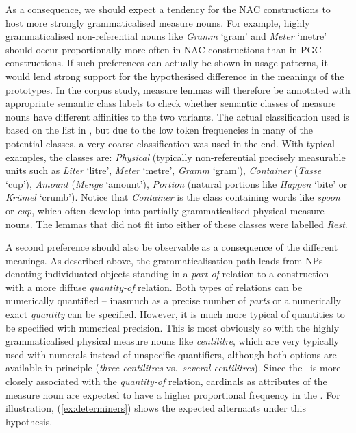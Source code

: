 As a consequence, we should expect a tendency for the NAC constructions to host more strongly grammaticalised measure nouns.
For example, highly grammaticalised non-referential nouns like \textit{Gramm} `gram' and \textit{Meter} `metre' should occur proportionally more often in NAC constructions than in PGC constructions.
If such preferences can actually be shown in usage patterns, it would lend strong support for the hypothesised difference in the meanings of the prototypes.
In the corpus study, measure lemmas will therefore be annotated with appropriate semantic class labels to check whether semantic classes of measure nouns have different affinities to the two variants.
The actual classification used is based on the list in \citet[530]{Koptjevskaja2001}, but due to the low token frequencies in many of the potential classes, a very coarse classification was used in the end.
With typical examples, the classes are:
\textit{Physical} (typically non-referential precisely measurable units such as \textit{Liter} `litre', \textit{Meter} `metre', \textit{Gramm} `gram'),
\textit{Container} (\textit{Tasse} `cup'),
\textit{Amount} (\textit{Menge} `amount'), 
\textit{Portion} (natural portions like \textit{Happen} `bite' or \textit{Krümel} `crumb').
Notice that \textit{Container} is the class containing words like \textit{spoon} or \textit{cup}, which often develop into partially grammaticalised physical measure nouns.
The lemmas that did not fit into either of these classes were labelled \textit{Rest}.

A second preference should also be observable as a consequence of the different meanings.
As described above, the grammaticalisation path leads from NPs denoting individuated objects standing in a \textit{part-of} relation to a construction with a more diffuse \textit{quantity-of} relation.
Both types of relations can be numerically quantified -- inasmuch as a precise number of \textit{parts} or a numerically exact \textit{quantity} can be specified.
However, it is much more typical of quantities to be specified with numerical precision.
This is most obviously so with the highly grammaticalised physical measure nouns like \textit{centilitre}, which are very typically used with numerals instead of unspecific quantifiers, although both options are available in principle (\textit{three centilitres} vs.\ \textit{several centilitres}).
Since the \NACa\ is more closely associated with the \textit{quantity-of} relation, cardinals as attributes of the measure noun are expected to have a higher proportional frequency in the \NACa.
For illustration, (\ref{ex:determiners}) shows the expected alternants under this hypothesis.

